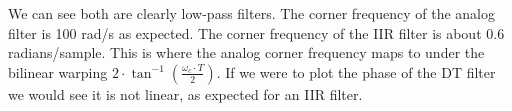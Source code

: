 \documentclass{article}
\begin{document}
We can see both are clearly low-pass filters. The corner frequency of the analog filter is 100 rad/s as expected. The corner frequency of the IIR filter is about 0.6 radians/sample. This is where the analog corner frequency maps to under the bilinear warping $2\cdot \tan^{-1}\left( \frac{\omega_c \cdot T}{2}\right)$. If we were to plot the phase of the DT filter we would see it is not linear, as expected for an IIR filter.
\end{document}
